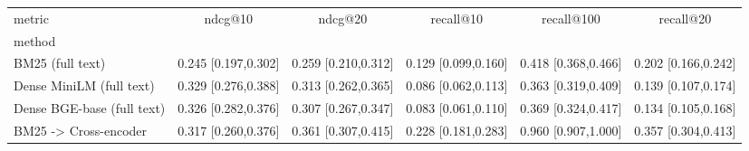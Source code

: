 \begin{tabular}{lccccc}
\toprule
metric & ndcg@10 & ndcg@20 & recall@10 & recall@100 & recall@20 \\
method &  &  &  &  &  \\
\midrule
BM25 (full text) & 0.245 [0.197,0.302] & 0.259 [0.210,0.312] & 0.129 [0.099,0.160] & 0.418 [0.368,0.466] & 0.202 [0.166,0.242] \\
Dense MiniLM (full text) & 0.329 [0.276,0.388] & 0.313 [0.262,0.365] & 0.086 [0.062,0.113] & 0.363 [0.319,0.409] & 0.139 [0.107,0.174] \\
Dense BGE-base (full text) & 0.326 [0.282,0.376] & 0.307 [0.267,0.347] & 0.083 [0.061,0.110] & 0.369 [0.324,0.417] & 0.134 [0.105,0.168] \\
BM25 -> Cross-encoder & 0.317 [0.260,0.376] & 0.361 [0.307,0.415] & 0.228 [0.181,0.283] & 0.960 [0.907,1.000] & 0.357 [0.304,0.413] \\
\bottomrule
\end{tabular}
